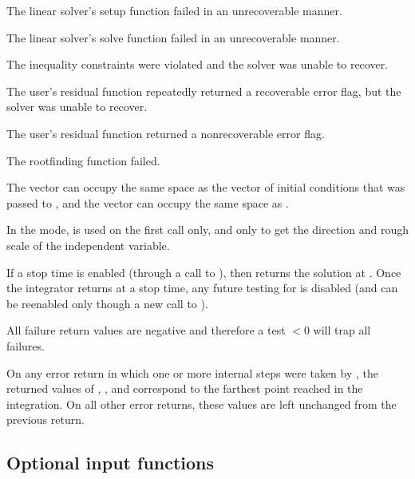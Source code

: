 {{\begin{args}
  \item[\Id{IDA\_LSETUP\_FAIL}]
    The linear solver's setup function failed in an unrecoverable manner.
  \item[\Id{IDA\_LSOLVE\_FAIL}]
    The linear solver's solve function failed in an unrecoverable manner.
  \item[\Id{IDA\_CONSTR\_FAIL}]
    The inequality constraints were violated and the solver was unable
    to recover.
  \item[\Id{IDA\_REP\_RES\_ERR}]
    The user's residual function repeatedly returned a recoverable error
    flag, but the solver was unable to recover.
  \item[\Id{IDA\_RES\_FAIL}]
    The user's residual function returned a nonrecoverable error flag.
  \item[\Id{IDA\_RTFUNC\_FAIL}]
    The rootfinding function failed.
  \end{args}
}
{
  The vector  can occupy the same space as the vector  of
  initial conditions that was passed to , and the
  vector  can occupy the same space as .

  In the  mode,  is used on the first call only,
  and only to get the direction and rough scale of the independent variable.

  If a stop time is enabled (through a call to ), then
   returns the solution at . Once the integrator returns
  at a stop time, any future testing for  is disabled (and can be
  reenabled only though a new call to ).
  
  All failure return values are negative and therefore a test  $< 0$
  will trap all  failures.

  On any error return in which one or more internal steps were taken by
  , the returned values of , , and 
  correspond to the farthest point reached in the integration.
  On all other error returns, these values are left unchanged from the
  previous  return.
}


\subsection{Optional input functions}\label{ss:optional_input}

}

